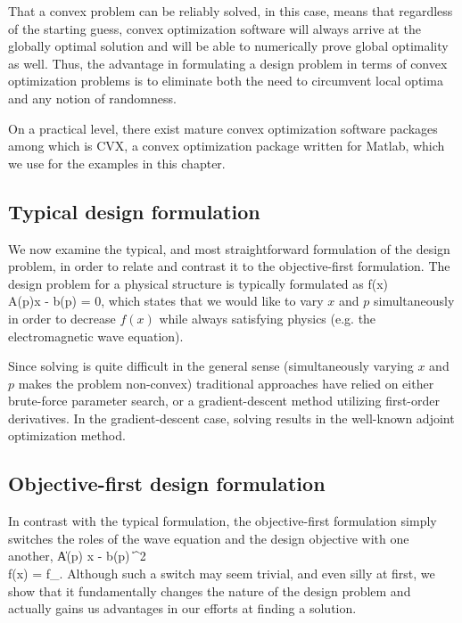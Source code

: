 That a convex problem can be reliably solved, in this case, 
    means that regardless of the starting guess,
    convex optimization software will 
    always arrive at the globally optimal solution
    and will be able to numerically prove global optimality as well.
Thus, the advantage in formulating a design problem 
    in terms of convex optimization problems
    is to eliminate both the need to circumvent local optima and 
    any notion of randomness.

On a practical level, there exist mature convex optimization software packages
    among which is CVX, a convex optimization package written for Matlab, %
    which we use for the examples in this chapter.


\subsection{Typical design formulation}
We now examine the typical, and most straightforward formulation
    of the design problem,
    in order to relate and contrast it to the objective-first formulation.
The design problem for a physical structure is typically formulated as
\BA {} f(x) \label{eq:typform} \\
    \subto A(p)x - b(p) = 0, \notag \EA
    which states that we would like to vary $x$ and $p$ simultaneously
    in order to decrease $f(x)$
    while always satisfying physics (e.g. the electromagnetic wave equation).

Since solving  is quite difficult in the general sense
    (simultaneously varying $x$ and $p$ makes the problem non-convex)
    traditional approaches have relied on either brute-force parameter search,
    or a gradient-descent method utilizing first-order derivatives.
In the gradient-descent case, solving  results in the
    well-known adjoint optimization method. %

\subsection{Objective-first design formulation}
In contrast with the typical formulation, the objective-first formulation 
    simply switches the roles of 
    the wave equation and the design objective with one another,
\BA {} \| A(p) x - b(p) \|^2 \label{eq:ob1:1} \\
    \subto f(x) = f_. \label{eq:ob1:2} \EA
Although such a switch may seem trivial,
    and even silly at first,
    we show that it fundamentally changes the nature of the design problem
    and actually gains us advantages in our efforts at finding a solution.

